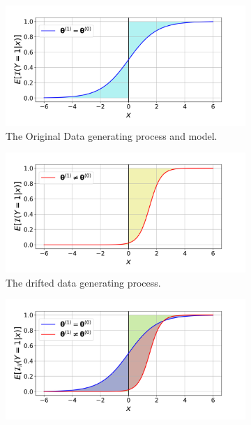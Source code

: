 \documentclass[twoside,11pt]{article}
\begin{document}
\begin{figure}[!htbp]
\centering
 \begin{subfigure}[t]{0.4\linewidth}
         \centering
         \includegraphics[width=\textwidth, trim=.2in .2in .7in .45in, clip]{../figures/v14/demons_fig/2D_logi_orig.png}
         \caption{The Original Data generating process and model.}
         \label{fig:logi_err_rate_unch_a}
  \end{subfigure}
  \begin{subfigure}[t]{0.4\linewidth}
         \centering
         \includegraphics[width=\textwidth, trim=.2in .2in .7in .45in, clip]{../figures/v14/demons_fig/2D_logi_cd.png}
         \caption{The drifted data generating process.}
         \label{fig:logi_err_rate_unch_b}
  \end{subfigure}
 \begin{subfigure}[t]{0.6\linewidth}
         \centering
	 \includegraphics[width = \textwidth, trim=.2in .2in .7in .45in, clip]{../figures/v14/demons_fig/2D_logi.png}

\end{subfigure}
\end{figure}
\end{document}
